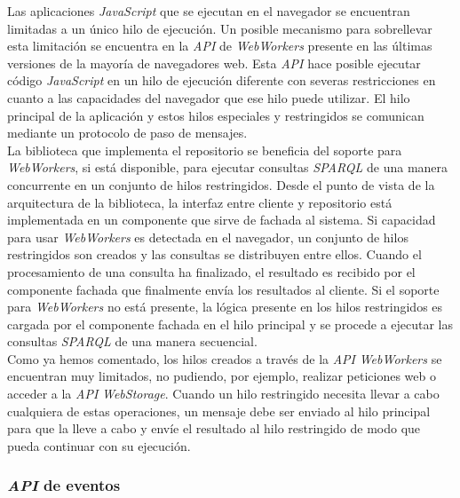 Las aplicaciones \textit{JavaScript} que se ejecutan en el navegador se encuentran limitadas a un \'unico hilo de ejecuci\'on. Un posible mecanismo para sobrellevar esta limitaci\'on se encuentra en la \textit{API} de \textit{WebWorkers} \cite{hicksonweb} presente en las \'ultimas versiones de la mayor\'ia de navegadores web. Esta \textit{API} hace posible ejecutar c\'odigo \textit{JavaScript} en un hilo de ejecuci\'on diferente con severas restricciones en cuanto a las capacidades del navegador que ese hilo puede utilizar. El hilo principal de la aplicaci\'on y estos hilos especiales y restringidos se comunican mediante un protocolo de paso de mensajes.\\
La biblioteca que implementa el repositorio se beneficia del soporte para \textit{WebWorkers}, si est\'a disponible, para ejecutar consultas \textit{SPARQL} de una manera concurrente en un conjunto de hilos restringidos. Desde el punto de vista de la arquitectura de la biblioteca, la interfaz entre cliente y repositorio est\'a implementada en un componente que sirve de fachada al sistema. Si capacidad para usar \textit{WebWorkers} es detectada en el navegador, un conjunto de hilos restringidos son creados y las consultas se distribuyen entre ellos. Cuando el procesamiento de una consulta ha finalizado, el resultado es recibido por el componente fachada que finalmente env\'ia los resultados al cliente. Si el soporte para \textit{WebWorkers} no est\'a presente, la l\'ogica presente en los hilos restringidos es cargada por el componente fachada en el hilo principal y se procede a ejecutar las consultas \textit{SPARQL} de una manera secuencial.\\
Como ya hemos comentado, los hilos creados a trav\'es de la \textit{API} \textit{WebWorkers} se encuentran muy limitados, no pudiendo, por ejemplo, realizar peticiones web o acceder a la \textit{API} \textit{WebStorage}. Cuando un hilo restringido necesita llevar a cabo cualquiera de estas operaciones, un mensaje debe ser enviado al hilo principal para que la lleve a cabo y env\'ie el resultado al hilo restringido de modo que pueda continuar con su ejecuci\'on.

\subsubsection{\textit{API} de eventos}

